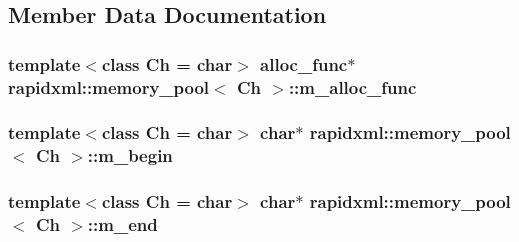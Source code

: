 \subsection{Member Data Documentation}
\hypertarget{classrapidxml_1_1memory__pool_ae8964773675d24f77a808356be773c1d}{}
\subsubsection[{m\+\_\+alloc\+\_\+func}]{\setlength{\rightskip}{0pt plus 5cm}template$<$class Ch  = char$>$ alloc\+\_\+func$\ast$ {\bf rapidxml\+::memory\+\_\+pool}$<$ Ch $>$\+::m\+\_\+alloc\+\_\+func\hspace{0.3cm}{\ttfamily [private]}}\label{classrapidxml_1_1memory__pool_ae8964773675d24f77a808356be773c1d}
\hypertarget{classrapidxml_1_1memory__pool_a775205c5faa60b63385c24368d26d4e1}{}
\subsubsection[{m\+\_\+begin}]{\setlength{\rightskip}{0pt plus 5cm}template$<$class Ch  = char$>$ char$\ast$ {\bf rapidxml\+::memory\+\_\+pool}$<$ Ch $>$\+::m\+\_\+begin\hspace{0.3cm}{\ttfamily [private]}}\label{classrapidxml_1_1memory__pool_a775205c5faa60b63385c24368d26d4e1}
\hypertarget{classrapidxml_1_1memory__pool_a6c9a83514446842518c9ffb7a38b76eb}{}
\subsubsection[{m\+\_\+end}]{\setlength{\rightskip}{0pt plus 5cm}template$<$class Ch  = char$>$ char$\ast$ {\bf rapidxml\+::memory\+\_\+pool}$<$ Ch $>$\+::m\+\_\+end\hspace{0.3cm}{\ttfamily [private]}}\label{classrapidxml_1_1memory__pool_a6c9a83514446842518c9ffb7a38b76eb}
\hypertarget{classrapidxml_1_1memory__pool_af8f41565f4de167eb2f40ca20695f24d}{}
